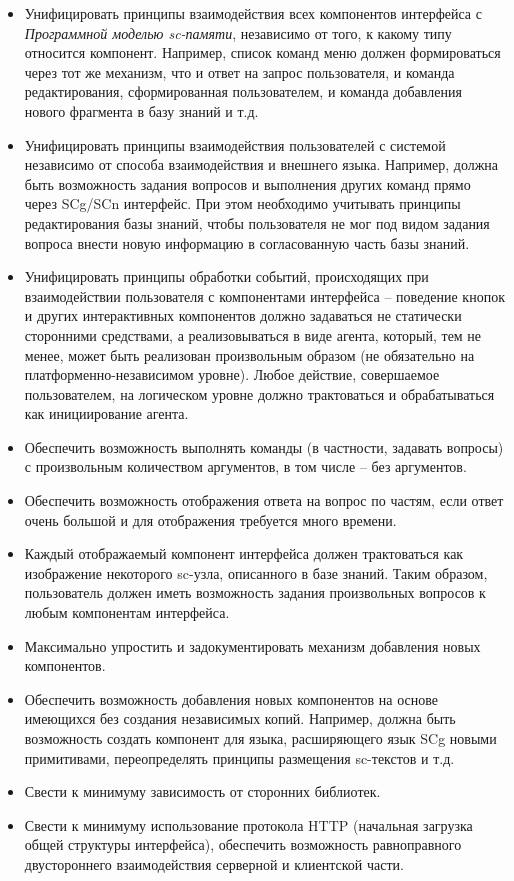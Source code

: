 \begin{itemize}
    \item Унифицировать принципы взаимодействия всех компонентов интерфейса с \textit{Программной моделью sc-памяти},
    независимо от того, к какому типу относится компонент. Например, список команд меню должен формироваться через тот
    же механизм, что и ответ на запрос пользователя, и команда редактирования, сформированная пользователем, и команда
    добавления нового фрагмента в базу знаний и т.д.
    \item Унифицировать принципы взаимодействия пользователей с системой независимо от способа взаимодействия и
    внешнего языка. Например, должна быть возможность задания вопросов и выполнения других команд прямо через SCg/SCn
    интерфейс. При этом необходимо учитывать принципы редактирования базы знаний, чтобы пользователя не мог под
    видом задания вопроса внести новую информацию в согласованную часть базы знаний.
    \item Унифицировать принципы обработки событий, происходящих при взаимодействии пользователя с компонентами
    интерфейса -- поведение кнопок и других интерактивных компонентов должно задаваться не статически сторонними
    средствами, а реализовываться в виде агента, который, тем не менее, может быть реализован произвольным образом
    (не обязательно на платформенно-независимом уровне). Любое действие, совершаемое пользователем, на логическом
    уровне должно трактоваться и обрабатываться как инициирование агента.
    \item Обеспечить возможность выполнять команды (в частности, задавать вопросы) с произвольным количеством
    аргументов, в том числе -- без аргументов.
    \item Обеспечить возможность отображения ответа на вопрос по частям, если ответ очень большой и для отображения
    требуется много времени.
    \item Каждый отображаемый компонент интерфейса должен трактоваться как изображение некоторого sc-узла, описанного в
    базе знаний. Таким образом, пользователь должен иметь возможность задания произвольных вопросов к любым компонентам
    интерфейса.
    \item Максимально упростить и задокументировать механизм добавления новых компонентов.
    \item Обеспечить возможность добавления новых компонентов на основе имеющихся без создания независимых копий.
    Например, должна быть возможность создать компонент для языка, расширяющего язык SCg новыми примитивами,
    переопределять принципы размещения sc-текстов и т.д.
    \item Свести к минимуму зависимость от сторонних библиотек.
    \item Свести к минимуму использование протокола HTTP (начальная загрузка общей структуры интерфейса), обеспечить
    возможность равноправного двустороннего взаимодействия серверной и клиентской части.
\end{itemize}

